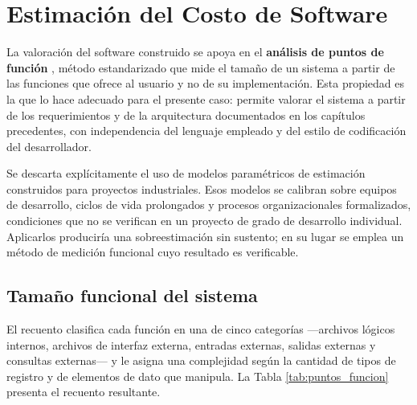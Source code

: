 \section{Estimación del Costo de Software}

La valoración del software construido se apoya en el \textbf{análisis de puntos
de función} \cite{albrecht1979measuring,ifpug2010counting}, método estandarizado que mide el tamaño de un sistema a partir de las
funciones que ofrece al usuario y no de su implementación. Esta propiedad es la
que lo hace adecuado para el presente caso: permite valorar el sistema a partir
de los requerimientos y de la arquitectura documentados en los capítulos
precedentes, con independencia del lenguaje empleado y del estilo de codificación
del desarrollador.

Se descarta explícitamente el uso de modelos paramétricos de estimación
\cite{boehm1981software}
construidos para proyectos industriales. Esos modelos se calibran sobre equipos de
desarrollo, ciclos de vida prolongados y procesos organizacionales formalizados,
condiciones que no se verifican en un proyecto de grado de desarrollo individual.
Aplicarlos produciría una sobreestimación sin sustento; en su lugar se emplea un
método de medición funcional cuyo resultado es verificable.

\subsection{Tamaño funcional del sistema}

El recuento clasifica cada función en una de cinco categorías ---archivos lógicos
internos, archivos de interfaz externa, entradas externas, salidas externas y
consultas externas--- y le asigna una complejidad según la cantidad de tipos de
registro y de elementos de dato que manipula. La Tabla \ref{tab:puntos_funcion}
presenta el recuento resultante.

